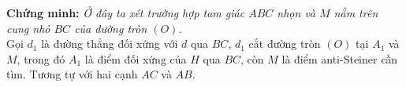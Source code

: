 \documentclass[12pt,a4paper]{article}
\begin{document}
\textbf{Chứng minh:} \textit{Ở đây ta xét trường hợp tam giác \(ABC\) nhọn và \(M\) nằm trên cung nhỏ \(BC\) của đường tròn \(\left( O \right)\).}\\
Gọi \({d_1}\) là đường thẳng đối xứng với \(d\) qua \(BC\), \({d_1}\) cắt đường tròn \(\left( O \right)\) tại \({A_1}\) và \(M\), trong đó \({A_1}\) là điểm đối xứng của \(H\) qua \(BC\), còn \(M\) là điểm anti-Steiner cần tìm. Tương tự với hai cạnh \(AC\) và \(AB\).    
\end{document}
